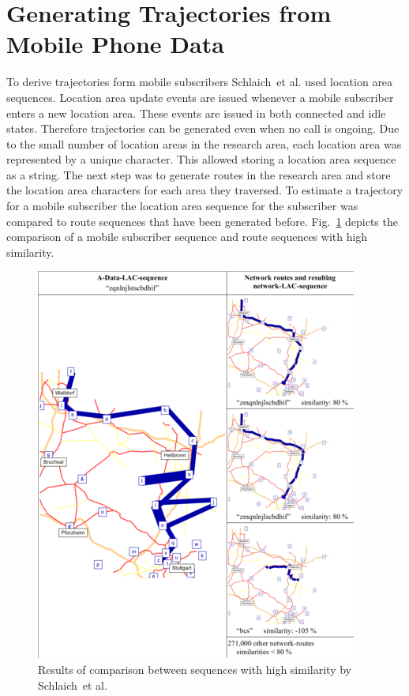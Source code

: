 \documentclass[master,english]{hgbthesis}
\begin{document}
\section{Generating Trajectories from Mobile Phone Data}

To derive trajectories form mobile subscribers Schlaich~et al. \cite{Schlaich2010a} used location area sequences. Location area update events are issued whenever a mobile subscriber enters a new location area. These events are issued in both connected and idle states. Therefore trajectories can be generated even when no call is ongoing. Due to the small number of location areas in the research area, each location area was represented by a unique character. This allowed storing a location area sequence as a string. The next step was to generate routes in the research area and store the location area characters for each area they traversed. To estimate a trajectory for a mobile subscriber the location area sequence for the subscriber was compared to route sequences that have been generated before. Fig.\ \ref{fig:schlaichcomp} depicts the comparison of a mobile subscriber sequence and route sequences with high similarity.

\begin{figure}

\centering

\includegraphics[width=0.7\linewidth]{./images/schlaichcomp.png}

\caption{Results of comparison between sequences with high similarity by Schlaich~et al.\ \cite{Schlaich2010a}}

\label{fig:schlaichcomp}

\end{figure}
\end{document}
